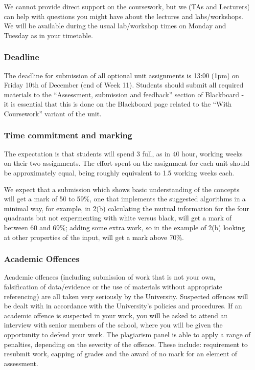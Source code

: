 \documentclass[12pt]{article}
\begin{document}
 We cannot provide direct support on the coursework, but we (TAs and
 Lecturers) can help with questions you might have about the lectures
 and labs/workshops. We will be available during the usual
 lab/workshop times on Monday and Tuesday as in your timetable.

 \subsubsection*{Deadline}

The deadline for submission of all optional unit assignments is 13:00
(1pm) on Friday 10th of December (end of Week 11). Students should
submit all required materials to the “Assessment, submission and
feedback” section of Blackboard - it is essential that this is done on
the Blackboard page related to the “With Coursework” variant of the
unit.

 \subsubsection*{Time commitment and marking}

The expectation is that students will spend 3 full, as in 40 hour,
working weeks on their two assignments. The effort spent on the
assignment for each unit should be approximately equal, being roughly
equivalent to 1.5 working weeks each.

We expect that a submission which shows basic understanding of the
concepts will get a mark of 50 to 59\%, one that implements the
suggested algorithms in a minimal way, for example, in 2(b)
calculating the mutual information for the four quadrants but not
expermenting with white versus black, will get a mark of between 60
and 69\%; adding some extra work, so in the example of 2(b) looking at
other properties of the input, will get a mark above 70\%. 

 \subsubsection*{Academic Offences}

Academic offences (including submission of work that is not your own,
falsification of data/evidence or the use of materials without
appropriate referencing) are all taken very seriously by the
University. Suspected offences will be dealt with in accordance with
the University’s policies and procedures. If an academic offence is
suspected in your work, you will be asked to attend an interview with
senior members of the school, where you will be given the opportunity
to defend your work. The plagiarism panel is able to apply a range of
penalties, depending on the severity of the offence. These include:
requirement to resubmit work, capping of grades and the award of no
mark for an element of assessment.
\end{document}
